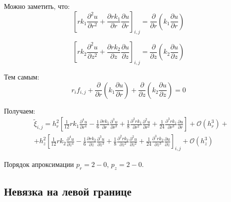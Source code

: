 Можно заметить, что:
\[
  \left[ rk_1 \frac{\partial^2 u}{\partial r^2} + \frac{\partial rk_1}{\partial r}\frac{\partial u}{\partial r} \right]_{i, j} =
  \frac{\partial}{\partial r} \left( k_1 \frac{\partial u}{\partial r} \right)
\]

\[
  \left[ r k_2 \frac{\partial^2 u}{\partial z^2} + \frac{\partial r k_2}{\partial z} \frac{\partial u}{\partial z} \right]_{i, j} =
  \frac{\partial}{\partial z} \left( k_2 \frac{\partial u}{\partial z} \right)
\]

Тем самым:
\[
  r_if_{i, j} + \frac{\partial}{\partial r} \left( k_1 \frac{\partial u}{\partial r} \right) +
  \frac{\partial}{\partial z} \left( k_2 \frac{\partial u}{\partial z} \right) = 0
\]

Получаем:
\begin{align*}
  &\tilde{\xi}_{i, j} = 
  h^2_r\left[ \frac{1}{12} r k_1 \frac{\partial^4 u}{\partial r^4} - \frac{1}{6}\frac{\partial rk_1}{\partial r}\frac{\partial^3 u}{\partial r^3}
  + \frac{1}{8} \frac{\partial^2 rk_1}{\partial r^2}\frac{\partial^2 u}{\partial r^2}
  + \frac{1}{24} \frac{\partial^3 rk_1}{\partial r^3}\frac{\partial u}{\partial r} \right] + \mathcal{O}(h_r^3) + \\
  &+ h^2_z \left[
    \frac{1}{12} r k_2 \frac{\partial^4 u}{\partial z^4} - \frac{1}{6} \frac{\partial r k_2}{\partial z} \frac{\partial^3 u}{\partial z^3}
    + \frac{1}{8} \frac{\partial^2 r k_2}{\partial z^2} \frac{\partial^2 u}{\partial z^2}
    + \frac{1}{24} \frac{\partial^3 r k_2}{\partial z^3} \frac{\partial u}{\partial z}
     \right]_{i, j} + \mathcal{O}(h_z^3)
\end{align*}

Порядок апроксимации $p_r = 2 - 0 $, $ p_z = 2 - 0 $.

\subsection{Невязка на левой границе}